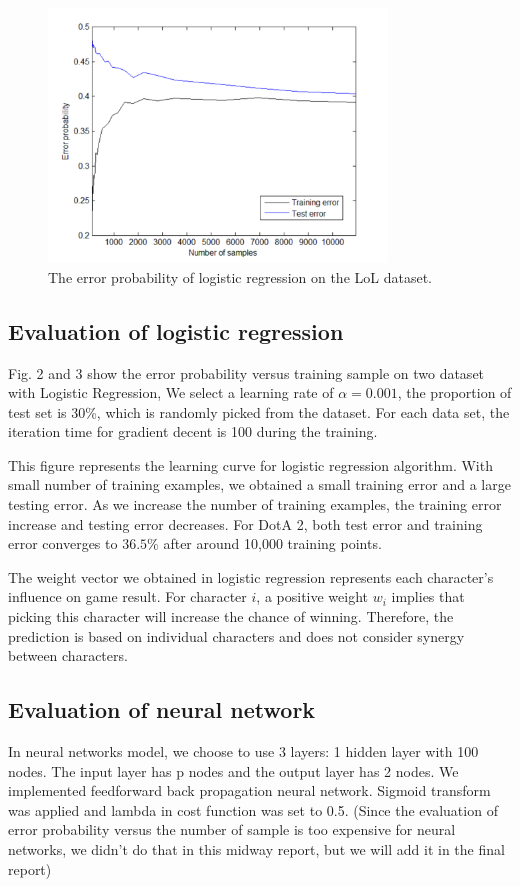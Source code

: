 \documentclass{article} %
\begin{document}
\begin{figure}[t]
  \centering
    \includegraphics[width=90mm]{lol_logreg_error.pdf}
  \caption{The error probability of logistic regression on the LoL dataset.}
  \label{fig:lol_log}
\end{figure}



\subsection{Evaluation of logistic regression}

Fig. 2 and 3 show the error probability versus training sample on two dataset with Logistic Regression, We select a learning rate of $\alpha = 0.001$, the proportion of test set is 30\%, which is randomly picked from the dataset. For each data set, the iteration time for gradient decent is 100 during the training.

This figure represents the learning curve for logistic regression algorithm. With small number of training examples, we obtained a small training error and a large testing error. As we increase the number of training examples, the training error increase and testing error decreases. For DotA 2, both test error and training error converges to $36.5\%$ after around 10,000 training points.

The weight vector we obtained in logistic regression represents each character's influence on game result. For character $i$, a positive weight $w_i$ implies that picking this character will increase the chance of winning. Therefore, the prediction is based on individual characters and does not consider synergy between characters.

\subsection{Evaluation of neural network}
In neural networks model, we choose to use 3 layers: 1 hidden layer with 100 nodes. The input layer has p nodes and the output layer has 2 nodes. We implemented feedforward back propagation neural network. Sigmoid transform was applied and lambda in cost function was set to 0.5. (Since the evaluation of error probability versus the number of sample is too expensive for neural networks, we didn't do that in this midway report, but we will add it in the final report)
\end{document}
